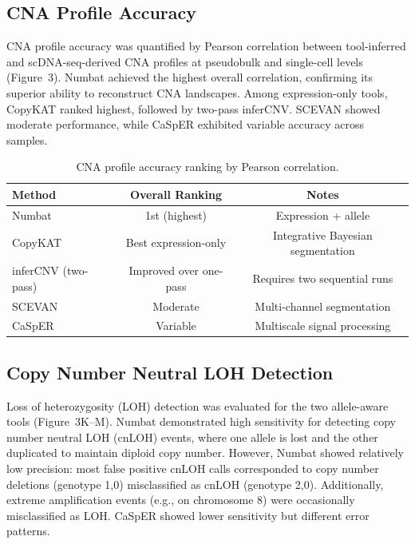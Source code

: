 \documentclass[11pt]{article}
\begin{document}
\subsection{CNA Profile Accuracy}

CNA profile accuracy was quantified by Pearson correlation between tool-inferred and scDNA-seq-derived CNA profiles at pseudobulk and single-cell levels (Figure~3). Numbat achieved the highest overall correlation, confirming its superior ability to reconstruct CNA landscapes. Among expression-only tools, CopyKAT ranked highest, followed by two-pass inferCNV. SCEVAN showed moderate performance, while CaSpER exhibited variable accuracy across samples.

\begin{table}[H]
\centering
\caption{CNA profile accuracy ranking by Pearson correlation.}
\label{tab:accuracy}
\begin{tabular}{lcc}
\toprule
Method & Overall Ranking & Notes \\
\midrule
Numbat & 1st (highest) & Expression + allele \\
CopyKAT & Best expression-only & Integrative Bayesian segmentation \\
inferCNV (two-pass) & Improved over one-pass & Requires two sequential runs \\
SCEVAN & Moderate & Multi-channel segmentation \\
CaSpER & Variable & Multiscale signal processing \\
\bottomrule
\end{tabular}
\end{table}

\subsection{Copy Number Neutral LOH Detection}

Loss of heterozygosity (LOH) detection was evaluated for the two allele-aware tools (Figure~3K--M). Numbat demonstrated high sensitivity for detecting copy number neutral LOH (cnLOH) events, where one allele is lost and the other duplicated to maintain diploid copy number. However, Numbat showed relatively low precision: most false positive cnLOH calls corresponded to copy number deletions (genotype 1,0) misclassified as cnLOH (genotype 2,0). Additionally, extreme amplification events (e.g., on chromosome 8) were occasionally misclassified as LOH. CaSpER showed lower sensitivity but different error patterns.
\end{document}
